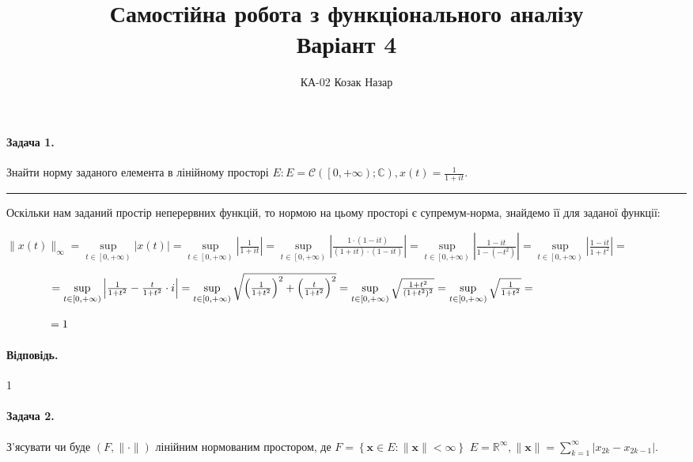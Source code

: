\documentclass[a5paper, 20pt, titlepage]{article}
\title{Самостійна робота з функціонального аналізу \\ Варіант 4}
\author{\vspace{-4mm} КА-02 Козак Назар}
\date{}
\newcommand{\supp}{\sup \limits_{t \in \left[ 0, +\infty \right)}}
\begin{document}
\maketitle

\paragraph{Задача 1.} \hfill \nolinebreak Знайти норму заданого елемента в лінійному просторі $E: E = \mathcal{C} \left( \left[ 0, +\infty \right); \mathbb{C} \right), x(t) = \frac{1}{1+it}.$
\vspace{3mm}

\noindent\rule{4cm}{0.4pt}

Оскільки нам заданий простір неперервних функцій, то нормою на цьому просторі є супремум-норма, знайдемо її для заданої функції:

\vspace{3mm}

$\|x(t) \|_\infty =\supp |x(t)| = \supp \left| \frac{1}{1 + it} \right| = \supp \left| \frac{1 \cdot (1 - it)}{(1 + it)\cdot(1 - it)} \right| = \supp \left| \frac{1 - it}{1 - (-t^2)} \right| = \supp \left| \frac{1 - it}{1 + t^2} \right| = $ 

\vspace{4mm}

$ \hspace{14mm} = \supp \left| \frac{1}{1+t^2} - \frac{t}{1+t^2} \cdot i \right| = \supp \sqrt{\left( \frac{1}{1+t^2} \right)^2 + \left( \frac{t}{1+t^2}  \right)^2} = \supp \sqrt{\frac{1+t^2}{(1+t^2)^2}} = \supp \sqrt{\frac{1}{1+t^2}} = $

\vspace{4mm}

$\hspace{14mm} = 1$ 

\vspace{4mm}
\paragraph{Відповідь.}  1

\vspace{7mm}

\paragraph{Задача 2.} \hfill \nolinebreak  З'ясувати чи буде $\left( F, \| \cdot \| \right)$ лінійним нормованим простором, де $F = \left\{ \textbf{x} \in E: 
\| \textbf{x} \| < \infty  \right\}$ \linebreak $E = \mathbb{R}^\infty, \| \textbf{x} \| = \sum \limits_{k = 1}^{\infty} \left| x_{2k} - x_{2k-1} \right|.$
\end{document}
